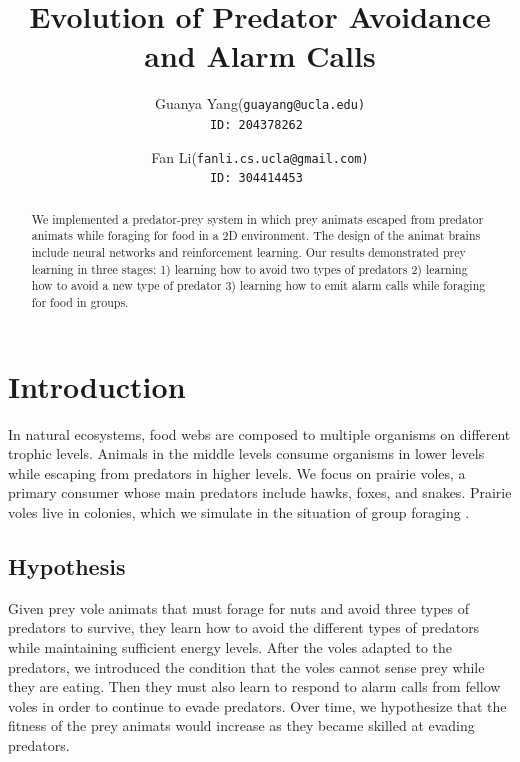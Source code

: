 \documentclass[10pt,conference,letterpaper,doublecolumn]{IEEEtran}
\begin{document}
\title{Evolution of Predator Avoidance and Alarm Calls}

\author{Guanya Yang(\tt{guayang@ucla.edu}) \\
        ID: 204378262
      \and
        Fan Li(\tt{fanli.cs.ucla@gmail.com}) \\
        ID: 304414453
        }
\date{}
\maketitle



\begin{abstract}
We implemented a predator-prey system in which prey animats escaped from predator animats while foraging for food in a 2D environment. The design of the animat brains include neural networks and reinforcement learning. Our results demonstrated prey learning in three stages: 1) learning how to avoid two types of predators 2) learning how to avoid a new type of predator 3) learning how to emit alarm calls while foraging for food in groups.
\end{abstract}

\section{Introduction}
In natural ecosystems, food webs are composed to multiple organisms on different trophic levels. Animals in the middle levels consume organisms in lower levels while escaping from predators in higher levels. We focus on prairie voles, a primary consumer whose main predators include hawks, foxes, and snakes. Prairie voles live in colonies, which we simulate in the situation of group foraging \cite{animal1, animal2}.
\subsection{Hypothesis}
Given prey vole animats that must forage for nuts and avoid three types of predators to survive, they learn how to avoid the different types of predators while maintaining sufficient energy levels. After the voles adapted to the predators, we introduced the condition that the voles cannot sense prey while they are eating. Then they must also learn to respond to alarm calls from fellow voles in order to continue to evade predators. Over time, we hypothesize that the fitness of the prey animats would increase as they became skilled at evading predators.
\end{document}
